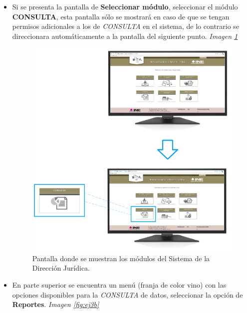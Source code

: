 \documentclass[../reportesINE.tex]{subfiles}
\begin{document}
\begin{itemize}
\item Si se presenta la pantalla de \textbf{Seleccionar módulo}, seleccionar el módulo \textbf{CONSULTA}, esta pantalla sólo se mostrará en caso de que se tengan permisos adicionales a los de \textit{CONSULTA} en el sistema, de lo contrario se direccionara automáticamente a la pantalla del siguiente punto. \textit{Imagen \ref{fig:ej3a}}

\begin{figure}[h]
  \centering
  \includegraphics[width=\linewidth]{ejemplo/ej3a.png}
  \caption{Pantalla donde se muestran los módulos del Sistema de la Dirección Jurídica.}
  \label{fig:ej3a}
\end{figure}

\item En parte superior se encuentra un menú (franja de color vino) con las opciones disponibles para la \textit{CONSULTA} de datos, seleccionar la opción de \textbf{Reportes}. \textit{Imagen \ref{fig:ej3b}}


\end{itemize}
\end{document}
